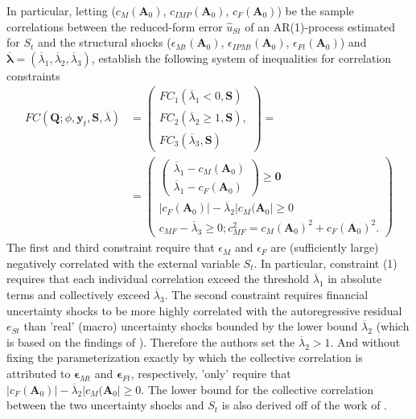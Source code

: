 \documentclass[a4paper,11pt,listof=nochaptergap,oneside,pointednumbers,bibtotoc,bigheadings,liststotoc,hidelinks]{scrbook}
\theoremstyle{mysatz}
\theoremstyle{mydefinition}
\theoremstyle{mytheorem}
\theoremstyle{mybemerkung}
\newcommand{\vect}[1]{\boldsymbol{\mathbf{#1}}}
\begin{document}
In particular, letting ($c_M(\vect{A}_0)$, $c_{IMP}(\vect{A}_0)$, $c_{F}(\vect{A}_0)$) be the sample correlations between the reduced-form error $\hat{u}_{St}$ of an AR(1)-process estimated for $S_t$ and the structural shocks ($\epsilon_{Mt}(\vect{A}_0)$, $\epsilon_{IPMt}(\vect{A}_0)$, $\epsilon_{Ft}(\vect{A}_0)$) and $\overline{\vect{\lambda}} = (\overline{\lambda}_1, \overline{\lambda}_2, \overline{\lambda}_3)$, \citet{ludvigsonetal:18} establish the following system of inequalities for correlation constraints
\begin{equation} \label{eq:svar_ludvi13}
\begin{split}
	FC(\vect{Q}; \phi, \vect{y}_t, \vect{S}, \overline{\lambda}) & = \begin{pmatrix}
	FC_1(\overline{\lambda}_1 < 0, \vect{S})\\
	 FC_2(\overline{\lambda}_2 \geq 1, \vect{S}), \\
	 FC_3(\overline{\lambda}_3, \vect{S})
	\end{pmatrix} = \\
	& = \begin{pmatrix}
	 		\begin{pmatrix}
	 			\overline{\lambda}_1 - c_M(\vect{A}_0)\\
				\overline{\lambda}_1 - c_F(\vect{A}_0)
			\end{pmatrix} \geq \vect{0} \\
			|c_F(\vect{A}_0)| - \overline{\lambda}_2|c_M(\vect{A}_0| \geq 0 \\
			c_{MF} - \overline{\lambda}_3 \geq 0; c_{MF}^2 = c_M(\vect{A}_0)^2 + c_F(\vect{A}_0)^2.
	\end{pmatrix} 
\end{split}								
\end{equation}
The first and third constraint require that $\epsilon_M$ and $\epsilon_F$ are (sufficiently large) negatively correlated with the external variable $S_t$. In particular, constraint (1) requires that each individual correlation exceed the threshold $\overline{\lambda}_1$ in absolute terms and collectively exceed $\overline{\lambda}_3$. The second constraint requires financial uncertainty shocks to be more highly correlated with the autoregressive residual $e_{St}$ than 'real' (macro) uncertainty shocks bounded by the lower bound $\overline{\lambda}_2$ (which is based on the findings of \citealp{btz:09}). Therefore the authors set the $\overline{\lambda}_2 > 1$. And without fixing the parameterization exactly by which the collective correlation is attributed to $\vect{\epsilon}_{Mt}$ and $\vect{\epsilon}_{Ft}$, respectively, \citet{ludvigsonetal:18} 'only' require that $|c_F(\vect{A}_0)| - \overline{\lambda}_2|c_M(\vect{A}_0| \geq 0 $. The lower bound for the collective correlation between the two uncertainty shocks and $S_t$ is also derived off of the work of \citet{btz:09}.
\end{document}
